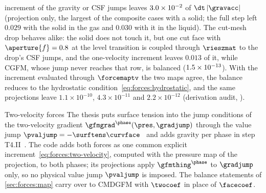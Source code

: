 increment of the gravity or CSF jumps leaves $3.0\times10^{-2}$ of
$\dt\abs{\gravacc}$ (projection only, the largest of the composite cases
with a solid; the full step left $0.029$ with the solid in the gas and
$0.030$ with it in the liquid). The cut-mesh drop behaves alike: the solid
does not touch it, but one cut face with $\aperture{f}=0.8$ at the level
transition is coupled through $\rieszmat$ to the drop's CSF jumps, and the
one-velocity increment leaves $0.013$ of it, while CGFM, whose jump never
reaches that row, is balanced ($1.5\times10^{-13}$). With the increment evaluated through $\forcemaptv$ the
two maps agree, the balance reduces to the hydrostatic
condition~\cref{eq:forces:hydrostatic}, and the same projections leave
$1.1\times10^{-10}$, $4.3\times10^{-11}$ and $2.2\times10^{-12}$
(derivation audit, ).

\begin{deviation}{Two-velocity forces}\label{dev:forces:two-velocity}
The thesis puts surface tension into the jump conditions of the
two-velocity gradient $\gfmgrad^{\phase}(\pres,\gradjump)$ through the value
jump $\pvaljump=-\surftens\curvface$~ and adds
gravity per phase in step T4.II~. The code adds both forces
as one common explicit increment~\cref{eq:forces:two-velocity}, computed with
the pressure map of the projection, to both phases; its projections apply
$\gfmthing^{\phase}$ to $\gradjump$ only, so no physical value jump
$\pvaljump$ is imposed. The balance statements of \cref{sec:forces:map}
carry over to CMDGFM with $\twocoef$ in place of $\facecoef$.
\end{deviation}

